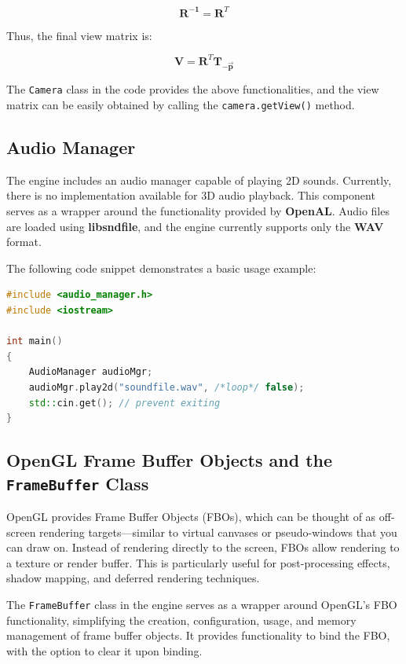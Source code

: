 \[
\mathbf{R^{-1}} = \mathbf{R}^T
\]

Thus, the final view matrix is:

\[
\mathbf{V} = \mathbf{R}^T \mathbf{T}_{-\mathbf{\overrightarrow{p}}}
\]


The \texttt{Camera} class in the code provides the above functionalities, and the view matrix can be easily obtained by calling the \texttt{camera.getView()} method.

\subsection{Audio Manager}

The engine includes an audio manager capable of playing 2D sounds. Currently, there is no implementation available for 3D audio playback. This component serves as a wrapper around the functionality provided by \textbf{OpenAL}. Audio files are loaded using \textbf{libsndfile}, and the engine currently supports only the \textbf{WAV} format.

The following code snippet demonstrates a basic usage example:

\begin{lstlisting}[language={C++}]
#include <audio_manager.h>
#include <iostream>

int main() 
{
    AudioManager audioMgr;
    audioMgr.play2d("soundfile.wav", /*loop*/ false);
    std::cin.get(); // prevent exiting
}
\end{lstlisting}



\subsection{OpenGL Frame Buffer Objects and the \texttt{FrameBuffer} Class}

OpenGL provides Frame Buffer Objects (FBOs), which can be thought of as off-screen rendering targets—similar to virtual canvases or pseudo-windows that you can draw on. Instead of rendering directly to the screen, FBOs allow rendering to a texture or render buffer. This is particularly useful for post-processing effects, shadow mapping, and deferred rendering techniques.

The \texttt{FrameBuffer} class in the engine serves as a wrapper around OpenGL’s FBO functionality, simplifying the creation, configuration, usage, and memory management of frame buffer objects. It provides functionality to bind the FBO, with the option to clear it upon binding.

